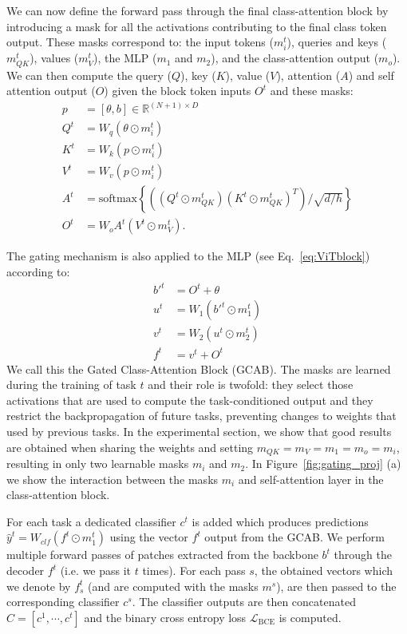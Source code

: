 \documentclass[twocolumn]{svjour3}          %
\begin{document}
We can now define the forward pass through the final class-attention block by introducing a mask for all the activations contributing to the final class token output. These masks correspond to: the input tokens ($m^t_i$), queries and keys ($m^t_{QK}$), values ($m^t_V$), the MLP ($m_1$ and $m_2$), and the class-attention output ($m_o$). We can then compute the query ($Q$), key ($K$), value ($V$), attention ($A$) and self attention output ($O$) given the block token inputs $O^t$ and these masks:
\begin{align}
    p &=[\theta, b] \in \mathbb{R}^{(N+1)\times D} \nonumber \\
    Q^t &=W_q(\theta\odot m^t_i) \nonumber \\
    K^t &=W_k( p \odot m^t_i) \nonumber \\
    V^t &=W_v( p \odot m^t_i) \\
    A^t &=\text{softmax}\left\{ \left(\left(Q^t \odot m^t_{QK}\right) \left(K^t\odot m^t_{QK}\right)^{T}\right) / \sqrt{d/h}\right\} \nonumber \\
    O^t &=W_o A^t(V^t\odot m^t_{V}) \nonumber.
\label{eq:SA}
\end{align}

The gating mechanism is also applied to the MLP (see Eq.~\ref{eq:ViTblock}) according to:
\begin{equation}
\begin{aligned}
     b'^t &= O^t  + \theta \\
     u^t &= W_1(b'^t \odot m^t_1) \\
     v^t &= W_2(u^t \odot m^t_2) \\
     f^t &= v^t + O^t
\end{aligned}
\label{eq:MLP}
\end{equation}
We call this the Gated Class-Attention Block (GCAB). The masks are learned during the training of task $t$ and their role is twofold: they select those activations that are used to compute the task-conditioned output and they restrict the backpropagation of future tasks, preventing changes to weights that used by previous tasks. 
In the experimental section, we show that good results are obtained when sharing the weights and setting $m_{QK}=m_V=m_1=m_o=m_i$, resulting in only two learnable masks $m_i$ and $m_2$. In Figure~\ref{fig:gating_proj} (a) we show the interaction between the masks $m_i$ and self-attention layer in the class-attention block.
 


For each task a dedicated classifier $c^t$ is added  which produces predictions $\hat y^t = W_{clf} (f^t\odot m^t_1)$ using the vector $f^t$ output from the GCAB.  We perform multiple forward passes of patches extracted from the backbone $b^t$ through the decoder $f^t$ (i.e. we pass it $t$ times). For each pass $s$, the obtained vectors which we denote by $f^t_s$ (and are computed with the masks $m^s$), are then passed to the corresponding classifier $c^s$. The classifier outputs are then concatenated $C=[c^1,\cdots,c^t]$ and the binary cross entropy loss $\mathcal{L}_{\text{BCE}}$ is computed.
\end{document}

